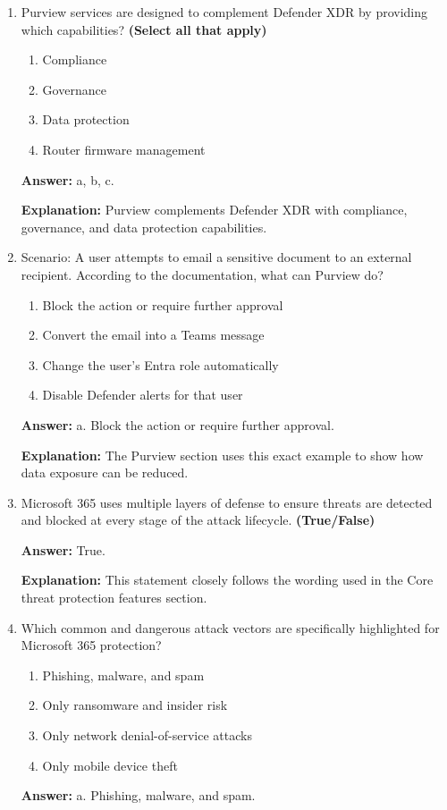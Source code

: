 \documentclass[10pt]{article}
\begin{document}
\begin{enumerate}[leftmargin=*]
\textbf{Explanation:} These integration scenarios are explicitly described in the Purview integration section.

\item Purview services are designed to complement Defender XDR by providing which capabilities? \textbf{(Select all that apply)}
\begin{enumerate}[label=\alph*., leftmargin=1.5em]
\item Compliance
\item Governance
\item Data protection
\item Router firmware management
\end{enumerate}
\textbf{Answer:} a, b, c.

\textbf{Explanation:} Purview complements Defender XDR with compliance, governance, and data protection capabilities.

\item Scenario: A user attempts to email a sensitive document to an external recipient. According to the documentation, what can Purview do?
\begin{enumerate}[label=\alph*., leftmargin=1.5em]
\item Block the action or require further approval
\item Convert the email into a Teams message
\item Change the user’s Entra role automatically
\item Disable Defender alerts for that user
\end{enumerate}
\textbf{Answer:} a. Block the action or require further approval.

\textbf{Explanation:} The Purview section uses this exact example to show how data exposure can be reduced.

\item Microsoft 365 uses multiple layers of defense to ensure threats are detected and blocked at every stage of the attack lifecycle. \textbf{(True/False)}

\textbf{Answer:} True.

\textbf{Explanation:} This statement closely follows the wording used in the Core threat protection features section.

\item Which common and dangerous attack vectors are specifically highlighted for Microsoft 365 protection?
\begin{enumerate}[label=\alph*., leftmargin=1.5em]
\item Phishing, malware, and spam
\item Only ransomware and insider risk
\item Only network denial-of-service attacks
\item Only mobile device theft
\end{enumerate}
\textbf{Answer:} a. Phishing, malware, and spam.


\end{enumerate}
\end{document}
